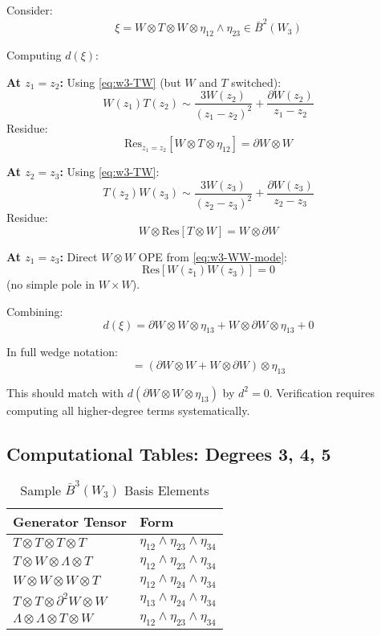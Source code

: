 \begin{computation}
Consider:
$$\xi = W \otimes T \otimes W \otimes \eta_{12} \wedge \eta_{23} \in \bar{B}^2(W_3)$$

Computing $d(\xi)$:

\textbf{At $z_1 = z_2$:} Using \eqref{eq:w3-TW} (but $W$ and $T$ switched):
$$W(z_1)T(z_2) \sim \frac{3W(z_2)}{(z_1-z_2)^2} + \frac{\partial W(z_2)}{z_1-z_2}$$
Residue:
$$\text{Res}_{z_1=z_2}[W \otimes T \otimes \eta_{12}] = \partial W \otimes W$$

\textbf{At $z_2 = z_3$:} Using \eqref{eq:w3-TW}:
$$T(z_2)W(z_3) \sim \frac{3W(z_3)}{(z_2-z_3)^2} + \frac{\partial W(z_3)}{z_2-z_3}$$
Residue:
$$W \otimes \text{Res}[T \otimes W] = W \otimes \partial W$$

\textbf{At $z_1 = z_3$:} Direct $W \otimes W$ OPE from \eqref{eq:w3-WW-mode}:
$$\text{Res}[W(z_1)W(z_3)] = 0$$
(no simple pole in $W \times W$).

Combining:
$$d(\xi) = \partial W \otimes W \otimes \eta_{13} + W \otimes \partial W \otimes \eta_{13} + 0$$

In full wedge notation:
$$= (\partial W \otimes W + W \otimes \partial W) \otimes \eta_{13}$$

This should match with $d(\partial W \otimes W \otimes \eta_{13})$ by $d^2 = 0$. Verification requires computing all higher-degree terms systematically.
\end{computation}

\subsection{Computational Tables: Degrees 3, 4, 5}

\begin{table}[h]
\centering
\caption{Sample $\bar{B}^3(W_3)$ Basis Elements}
\begin{tabular}{|l|l|}
\hline
\textbf{Generator Tensor} & \textbf{Form} \\
\hline
$T \otimes T \otimes T \otimes T$ & $\eta_{12} \wedge \eta_{23} \wedge \eta_{34}$ \\
$T \otimes W \otimes \Lambda \otimes T$ & $\eta_{12} \wedge \eta_{23} \wedge \eta_{34}$ \\
$W \otimes W \otimes W \otimes T$ & $\eta_{12} \wedge \eta_{24} \wedge \eta_{34}$ \\
$T \otimes T \otimes \partial^2 W \otimes W$ & $\eta_{13} \wedge \eta_{24} \wedge \eta_{34}$ \\
$\Lambda \otimes \Lambda \otimes T \otimes W$ & $\eta_{12} \wedge \eta_{23} \wedge \eta_{34}$ \\
\hline
\end{tabular}
\end{table}

